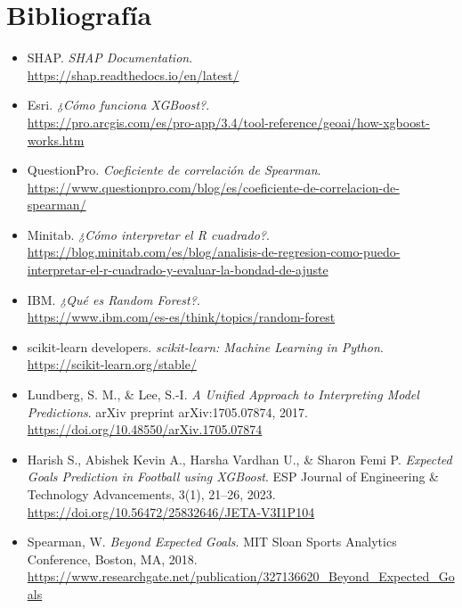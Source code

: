 \section*{Bibliografía}

\begin{itemize}[label={}]
    \item SHAP. \textit{SHAP Documentation}. \\
    \url{https://shap.readthedocs.io/en/latest/}
    
    \item Esri. \textit{¿Cómo funciona XGBoost?}. \\
    \url{https://pro.arcgis.com/es/pro-app/3.4/tool-reference/geoai/how-xgboost-works.htm}
     
    \item QuestionPro. \textit{Coeficiente de correlación de Spearman}. \\
    \url{https://www.questionpro.com/blog/es/coeficiente-de-correlacion-de-spearman/}
    
    \item Minitab. \textit{¿Cómo interpretar el R cuadrado?}. \\
    \url{https://blog.minitab.com/es/blog/analisis-de-regresion-como-puedo-interpretar-el-r-cuadrado-y-evaluar-la-bondad-de-ajuste}
    
    \item IBM. \textit{¿Qué es Random Forest?}. \\
    \url{https://www.ibm.com/es-es/think/topics/random-forest}
    
    \item scikit-learn developers. \textit{scikit-learn: Machine Learning in Python}. \\
    \url{https://scikit-learn.org/stable/}

    \item Lundberg, S. M., \& Lee, S.-I. \textit{A Unified Approach to Interpreting Model Predictions}. arXiv preprint arXiv:1705.07874, 2017. \\
    \url{https://doi.org/10.48550/arXiv.1705.07874}

    \item Harish S., Abishek Kevin A., Harsha Vardhan U., \& Sharon Femi P. \textit{Expected Goals Prediction in Football using XGBoost}. ESP Journal of Engineering \& Technology Advancements, 3(1), 21--26, 2023. \\
    \url{https://doi.org/10.56472/25832646/JETA-V3I1P104}

    \item Spearman, W. \textit{Beyond Expected Goals}. MIT Sloan Sports Analytics Conference, Boston, MA, 2018. \\
    \url{https://www.researchgate.net/publication/327136620_Beyond_Expected_Goals}
\end{itemize}